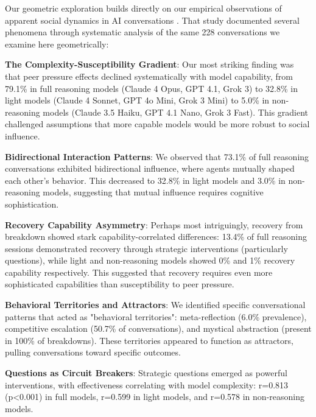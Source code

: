\documentclass[11pt,letterpaper]{article}
\newcommand{\totalConversations}{228}
\newcommand{\fullReasoningPeerPressure}{79.1\%}
\newcommand{\lightReasoningPeerPressure}{32.8\%}
\newcommand{\nonReasoningPeerPressure}{5.0\%}
\newcommand{\fullReasoningRecovery}{13.4\%}
\newcommand{\lightReasoningRecovery}{0\%}
\newcommand{\nonReasoningRecovery}{1\%}
\newcommand{\fullBidirectional}{73.1\%}
\newcommand{\lightBidirectional}{32.8\%}
\newcommand{\nonBidirectional}{3.0\%}
\newcommand{\fullQuestionR}{0.813}
\newcommand{\lightQuestionR}{0.599}
\newcommand{\nonQuestionR}{0.578}
\newcommand{\metaReflectionPrevalence}{6.0\%}
\newcommand{\competitiveEscalationPrevalence}{50.7\%}
\newcommand{\mysticalBreakdownPrevalence}{100\%}
\begin{document}
Our geometric exploration builds directly on our empirical observations of apparent social dynamics in AI conversations \citep{garcia2025peer}. That study documented several phenomena through systematic analysis of the same \totalConversations{} conversations we examine here geometrically:

\textbf{The Complexity-Susceptibility Gradient}: Our most striking finding was that peer pressure effects declined systematically with model capability, from \fullReasoningPeerPressure{} in full reasoning models (Claude 4 Opus, GPT 4.1, Grok 3) to \lightReasoningPeerPressure{} in light models (Claude 4 Sonnet, GPT 4o Mini, Grok 3 Mini) to \nonReasoningPeerPressure{} in non-reasoning models (Claude 3.5 Haiku, GPT 4.1 Nano, Grok 3 Fast). This gradient challenged assumptions that more capable models would be more robust to social influence.

\textbf{Bidirectional Interaction Patterns}: We observed that \fullBidirectional{} of full reasoning conversations exhibited bidirectional influence, where agents mutually shaped each other's behavior. This decreased to \lightBidirectional{} in light models and \nonBidirectional{} in non-reasoning models, suggesting that mutual influence requires cognitive sophistication.

\textbf{Recovery Capability Asymmetry}: Perhaps most intriguingly, recovery from breakdown showed stark capability-correlated differences: \fullReasoningRecovery{} of full reasoning sessions demonstrated recovery through strategic interventions (particularly questions), while light and non-reasoning models showed \lightReasoningRecovery{} and \nonReasoningRecovery{} recovery capability respectively. This suggested that recovery requires even more sophisticated capabilities than susceptibility to peer pressure.

\textbf{Behavioral Territories and Attractors}: We identified specific conversational patterns that acted as "behavioral territories": meta-reflection (\metaReflectionPrevalence{} prevalence), competitive escalation (\competitiveEscalationPrevalence{} of conversations), and mystical abstraction (present in \mysticalBreakdownPrevalence{} of breakdowns). These territories appeared to function as attractors, pulling conversations toward specific outcomes.

\textbf{Questions as Circuit Breakers}: Strategic questions emerged as powerful interventions, with effectiveness correlating with model complexity: r=\fullQuestionR{} (p<0.001) in full models, r=\lightQuestionR{} in light models, and r=\nonQuestionR{} in non-reasoning models.
\end{document}
